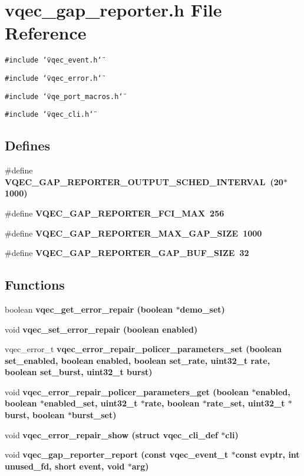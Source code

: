 \section{vqec\_\-gap\_\-reporter.h File Reference}
\label{vqec__gap__reporter_8h}
{\tt \#include \char`\"{}vqec\_\-event.h\char`\"{}}\par
{\tt \#include \char`\"{}vqec\_\-error.h\char`\"{}}\par
{\tt \#include \char`\"{}vqe\_\-port\_\-macros.h\char`\"{}}\par
{\tt \#include \char`\"{}vqec\_\-cli.h\char`\"{}}\par
\subsection*{Defines}
\begin{CompactItemize}
\item 
\#define \bf{VQEC\_\-GAP\_\-REPORTER\_\-OUTPUT\_\-SCHED\_\-INTERVAL}~(20$\ast$1000)
\item 
\#define \bf{VQEC\_\-GAP\_\-REPORTER\_\-FCI\_\-MAX}~256
\item 
\#define \bf{VQEC\_\-GAP\_\-REPORTER\_\-MAX\_\-GAP\_\-SIZE}~1000
\item 
\#define \bf{VQEC\_\-GAP\_\-REPORTER\_\-GAP\_\-BUF\_\-SIZE}~32
\end{CompactItemize}
\subsection*{Functions}
\begin{CompactItemize}
\item 
boolean \bf{vqec\_\-get\_\-error\_\-repair} (boolean $\ast$demo\_\-set)
\item 
void \bf{vqec\_\-set\_\-error\_\-repair} (boolean enabled)
\item 
vqec\_\-error\_\-t \bf{vqec\_\-error\_\-repair\_\-policer\_\-parameters\_\-set} (boolean set\_\-enabled, boolean enabled, boolean set\_\-rate, uint32\_\-t rate, boolean set\_\-burst, uint32\_\-t burst)
\item 
void \bf{vqec\_\-error\_\-repair\_\-policer\_\-parameters\_\-get} (boolean $\ast$enabled, boolean $\ast$enabled\_\-set, uint32\_\-t $\ast$rate, boolean $\ast$rate\_\-set, uint32\_\-t $\ast$burst, boolean $\ast$burst\_\-set)
\item 
void \bf{vqec\_\-error\_\-repair\_\-show} (struct \bf{vqec\_\-cli\_\-def} $\ast$cli)
\item 
void \bf{vqec\_\-gap\_\-reporter\_\-report} (const vqec\_\-event\_\-t $\ast$const evptr, int unused\_\-fd, short event, void $\ast$arg)
\end{CompactItemize}
